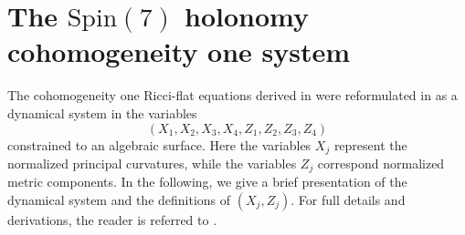 \documentclass[11pt,letterpaper]{amsart}
\theoremstyle{definition}
\numberwithin{equation}{section}
\newcommand{\spin}{\mathrm{Spin}}
\begin{document}
\section{The $\spin(7)$ holonomy cohomogeneity one system}
\label{sec: Ricci-flat Equation}
The cohomogeneity one Ricci-flat equations derived in \cite{reidegeld2011exceptional} were reformulated in \cite{chi2022spin} as a dynamical system in the variables
$$(X_1,X_2,X_3,X_4,Z_1,Z_2,Z_3,Z_4)$$ constrained to an algebraic surface. Here the variables $X_j$ represent the normalized principal curvatures, while the variables $Z_j$ correspond normalized metric components. In the following, we give a brief presentation of the dynamical system and the definitions of $(X_j,Z_j)$. For full details and derivations, the reader is referred to \cite{reidegeld2011exceptional, chi2022spin}.
\end{document}
